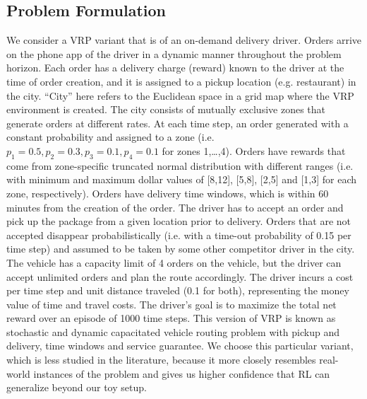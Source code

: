 \documentclass[letterpaper]{article} %
\begin{document}
\subsection{Problem Formulation}
\label{sec_vrp_pf}

We consider a VRP variant that is of an on-demand delivery driver. Orders arrive on the phone app of the driver in a dynamic manner throughout the problem horizon. Each order has a delivery charge (reward) known to the driver at the time of order creation, and it is assigned to a pickup location (e.g. restaurant) in the city. “City” here refers to the Euclidean space in a grid map where the VRP environment is created. The city consists of mutually exclusive zones that generate orders at different rates. At each time step, an order generated with a constant probability and assigned to a zone (i.e. $p_1=0.5,p_2=0.3,p_3=0.1,p_4=0.1$ for zones 1,…,4). Orders have rewards that come from zone-specific truncated normal distribution with different ranges (i.e. with minimum and maximum dollar values of [8,12], [5,8], [2,5] and [1,3] for each zone, respectively). Orders have delivery time windows, which is within 60 minutes from the creation of the order. The driver has to accept an order and pick up the package from a given location prior to delivery. Orders that are not accepted disappear probabilistically (i.e. with a time-out probability of 0.15 per time step) and assumed to be taken by some other competitor driver in the city. The vehicle has a capacity limit of 4 orders on the vehicle, but the driver can accept unlimited orders and plan the route accordingly. The driver incurs a cost per time step and unit distance traveled (0.1 for both), representing the money value of time and travel costs. The driver’s goal is to maximize the total net reward over an episode of 1000 time steps. This version of VRP is known as stochastic and dynamic capacitated vehicle routing problem with pickup and delivery, time windows and service guarantee.  We choose this particular variant, which is less studied in the literature, because it more closely resembles real-world instances of the problem and gives us higher confidence that RL can generalize beyond our toy setup.
\end{document}
